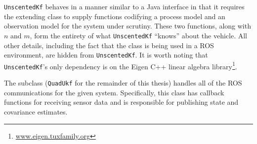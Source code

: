 \texttt{UnscentedKf} behaves in a manner similar to a Java interface in that it requires the extending class to supply functions codifying a process model and an observation model for the system under scrutiny. These two functions, along with $n$ and $m$, form the entirety of what \texttt{UnscentedKf} ``knows'' about the vehicle. All other details, including the fact that the class is being used in a ROS environment, are hidden from \texttt{UnscentedKf}. It is worth noting that \texttt{UnscentedKf}'s only dependency is on the Eigen C++ linear algebra library\footnote{\url{www.eigen.tuxfamily.org}}.

The subclass (\texttt{QuadUkf} for the remainder of this thesis) handles all of the ROS communications for the given system. Specifically, this class has callback functions for receiving sensor data and is responsible for publishing state and covariance estimates.

